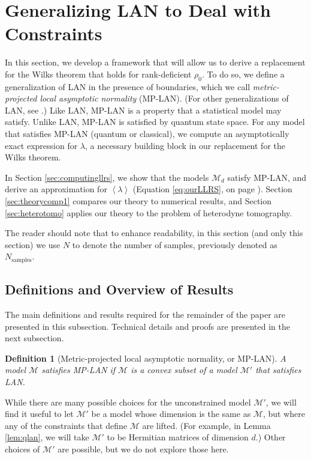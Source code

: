 \documentclass[aps,pra, twocolumn]{revtex4-1}
\newcommand{\M}{\mathcal{M}}
\newcommand{\expect}[1]{\ensuremath{\left\langle#1\right\rangle}}
\newtheorem{mydef}{Definition}
\begin{document}
\section{Generalizing LAN to Deal with Constraints}
\label{sec:lanreplacement}

In this section, we develop a framework that will allow us to derive a replacement for the Wilks theorem that holds for rank-deficient $\rho_{0}$. To do so, we define a generalization of LAN in the presence of boundaries, which we call \emph{metric-projected local asymptotic normality} (MP-LAN). (For other generalizations of LAN, see \cite{Roussas2010, Jeganathan1982}.) Like LAN, MP-LAN is a property that a statistical model may satisfy. Unlike LAN, MP-LAN is satisfied by quantum state space. For any model that satisfies MP-LAN (quantum or classical), we compute an asymptotically exact expression for $\lambda$, a necessary building block in our replacement for the Wilks theorem. 

In Section \ref{sec:computingllrs}, we show that the models $\M_{d}$ satisfy MP-LAN, and derive an approximation for $\expect{\lambda}$  (Equation \eqref{eq:ourLLRS}, on  page \pageref{eq:ourLLRS}).  Section \ref{sec:theorycomp1} compares our theory to numerical results, and Section \ref{sec:heterotomo} applies our theory to the problem of heterodyne tomography.


The reader should note that to enhance readability, in this section (and only this section) we use $N$ to denote the number of samples, previously denoted as $N_{\mathrm{samples}}$.

\subsection{Definitions and Overview of Results}
\label{sec:lanoverview}
The main definitions and results required for the remainder of the paper are presented in this subsection. Technical details and proofs are presented in the next subsection.

\begin{mydef}[Metric-projected local asymptotic normality, or MP-LAN]
A  model $\M$ satisfies MP-LAN if $\M$ is a convex subset of a model $\M'$ that satisfies LAN.
\end{mydef}

While there are many possible choices for the unconstrained model $\M'$, we will find it useful to let $\M'$ be a model whose dimension is the same as $\M$, but where any of the constraints that define $\M$ are lifted. (For example, in Lemma \ref{lem:qlan}, we will take $\M'$ to be Hermitian matrices of dimension $d$.) Other choices of $\M'$ are possible, but we do not explore those here.
\end{document}
